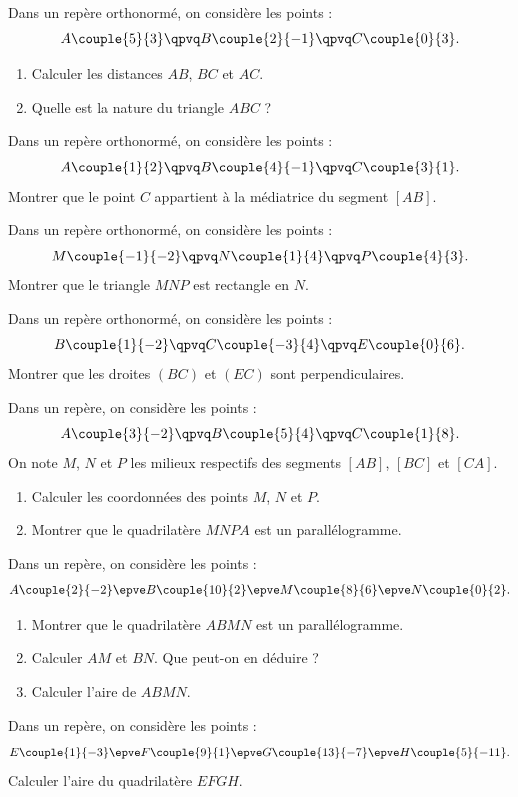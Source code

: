 \exo

Dans un repère orthonormé, on considère les points :
\[
A\couple{5}{3}
\qpvq
B\couple{2}{-1}
\qpvq
C\couple{0}{3}.
\]
\begin{enumerate}
\item Calculer les distances $AB$, $BC$ et $AC$.
\item Quelle est la nature du triangle $ABC$ ?
\end{enumerate}

\exo

Dans un repère orthonormé, on considère les points :
\[
A\couple{1}{2}
\qpvq
B\couple{4}{-1}
\qpvq
C\couple{3}{1}.
\]
Montrer que le point $C$ appartient à la médiatrice du segment $[AB]$.

\exo

Dans un repère orthonormé, on considère les points :
\[
M\couple{-1}{-2}
\qpvq
N\couple{1}{4}
\qpvq
P\couple{4}{3}.
\]
Montrer que le triangle $MNP$ est rectangle en $N$.

\exo

Dans un repère orthonormé, on considère les points :
\[
B\couple{1}{-2}
\qpvq
C\couple{-3}{4}
\qpvq
E\couple{0}{6}.
\]
Montrer que les droites $(BC)$ et $(EC)$ sont perpendiculaires.

\exo

Dans un repère, on considère les points :
\[
A\couple{3}{-2}
\qpvq
B\couple{5}{4}
\qpvq
C\couple{1}{8}.
\]
On note $M$, $N$ et $P$ les milieux respectifs des segments $[AB]$, $[BC]$ et $[CA]$.
\begin{enumerate}
\item Calculer les coordonnées des points $M$, $N$ et $P$.
\item Montrer que le quadrilatère $MNPA$ est un parallélogramme.
\end{enumerate}

\exo

Dans un repère, on considère les points :
\[
A\couple{2}{-2}
\epve
B\couple{10}{2}
\epve
M\couple{8}{6}
\epve
N\couple{0}{2}.
\]
\begin{enumerate}
\item Montrer que le quadrilatère $ABMN$ est un parallélogramme.
\item Calculer $AM$ et $BN$. Que peut-on en déduire ?
\item Calculer l'aire de $ABMN$.
\end{enumerate}

\exo

Dans un repère, on considère les points :
\[
E\couple{1}{-3}
\epve
F\couple{9}{1}
\epve
G\couple{13}{-7}
\epve
H\couple{5}{-11}.
\]
Calculer l'aire du quadrilatère $EFGH$.

